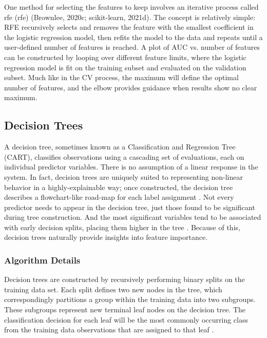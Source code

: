 One method for selecting the features to keep involves an iterative process called \acrlong{rfe} (\acrshort{rfe}) (Brownlee, 2020c; scikit-learn, 2021d). The concept is relatively simple: RFE recursively selects and removes the feature with the smallest coefficient in the logistic regression model, then refits the model to the data and repeats until a user-defined number of features is reached.  A plot of AUC vs. number of features can be constructed by looping over different feature limits, where the logistic regression model is fit on the training subset and evaluated on the validation subset. Much like in the CV process, the maximum will define the optimal number of features, and the elbow provides guidance when results show no clear maximum.

\subsection{Decision Trees}\label{ch3:decision_trees}
A decision tree, sometimes known as a Classification and Regression Tree (CART), classifies observations using a cascading set of evaluations, each on individual predictor variables. There is no assumption of a linear response in the system. In fact, decision trees are uniquely suited to representing non-linear behavior in a highly-explainable way; once constructed, the decision tree describes a flowchart-like road-map for each label assignment \citep[p. 373--375]{bertsimas_analytics_2016}. Not every predictor needs to appear in the decision tree, just those found to be significant during tree construction. And the most significant variables tend to be associated with early decision splits, placing them higher in the tree \citep[p. 376]{bertsimas_analytics_2016}. Because of this, decision trees naturally provide insights into feature importance. 

\subsubsection{Algorithm Details}\label{ch3:dtree_details}
Decision trees are constructed by recursively performing binary splits on the training data set. Each split defines two new nodes in the tree, which correspondingly partitions a group within the training data into two subgroups. These subgroups represent new terminal leaf nodes on the decision tree. The classification decision for each leaf will be the most commonly occurring class from the training data observations that are assigned to that leaf \citep[p. 311]{james_introduction_2013}.

